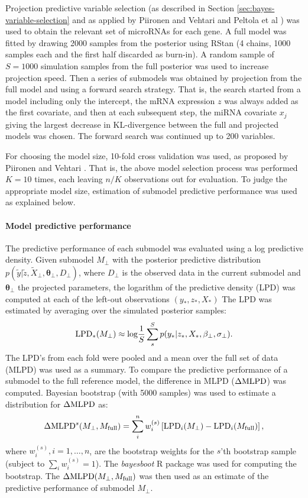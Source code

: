 Projection predictive variable selection (as described in Section
\ref{sec:bayes-variable-selection} and as applied by Piironen and Vehtari \citep{Piironen2015}
and Peltola et al \citep{Peltola2015}) was used to obtain the relevant set
of microRNAs for each gene. A full model was fitted by drawing 2000 samples
from the posterior using RStan (4 chains, 1000 samples each and the first half
discarded as burn-in). A random sample of $S=1000$ simulation samples from the
full posterior was used to increase projection speed. Then a series of
submodels was obtained by projection from the full model and using a forward
search strategy. That is, the search started from a model including only the
intercept, the mRNA expression $z$ was always added as the first covariate,
and then at each subsequent step, the miRNA covariate $x_j$ giving the largest
decrease in KL-divergence between the full and projected models was chosen.
The forward search was continued up to 200 variables.

For choosing the model size, 10-fold cross validation was used, as proposed by
Piironen and Vehtari \citep{Piironen2016}. That is, the above model selection
process was performed $K=10$ times, each leaving $n/K$ observations out for
evaluation. To judge the appropriate model size, estimation of submodel
predictive performance was used as explained below.

\paragraph{Model predictive performance}
The predictive performance of each submodel was evaluated using 
a log predictive density.
Given submodel $M_\perp$ with the posterior predictive distribution
$p(\tilde{y}| \tilde{z}, \tilde{X}_\perp, \mathbf{\theta}_\perp, D_\perp)$,
where $D_\perp$ is the observed data in the current submodel and
$\mathbf{\theta}_\perp$ the projected parameters, the logarithm of the predictive density
(LPD) was computed at each of the left-out observations $(y_*, z_*, X_*)$ The LPD was
estimated by averaging over the simulated posterior samples:
\[
	\textup{LPD}_*(M_\perp) \approx \textup{log}\frac{1}{S} \sum_s^S p(y_*| z_*, X_*, \mathbf{\beta}_\perp, \sigma_\perp).
\]
The LPD's from each fold were pooled and a mean over the full set of data
(MLPD) was used as a summary. To compare the predictive performance of a
submodel to the full reference model, the difference in MLPD ($\Delta \textup{MLPD}$) was
computed. Bayesian bootstrap (with 5000 samples) was used to estimate a
distribution for $\Delta \textup{MLPD}$ as:
\[
	\Delta \textup{MLPD}^{s}(M_\perp,M_{\textup{full}}) = \sum_i^n w_i^{(s)} \left [ \textup{LPD}_i(M_\perp) - \textup{LPD}_i(M_{\textup{full}}) \right ],
\]
where $w_i^{(s)}, i = 1, \dotsc,n$, are the bootstrap weights
for the $s$'th bootstrap sample (subject to $\sum_i w_i^{(s)} = 1$).
The \emph{bayesboot} R package was used for computing the bootstrap.
The $\Delta \textup{MLPD}(M_\perp,M_{\textup{full}})$ was then used
as an estimate of the predictive performance of submodel $M_\perp$.

